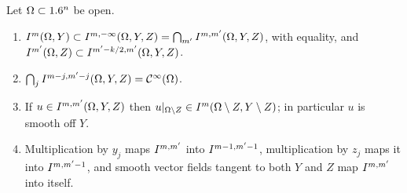\begin{proposition}\label{product:prop:model-properties}
Let $\Omega\subset1.6^n$ be open.
\begin{enumerate}[label=\textup{(\roman*)}]
\item $I^{m}(\Omega,Y)\subset I^{m,-\infty}(\Omega,Y,Z)=\bigcap_{m'}
I^{m,m'}(\Omega,Y,Z)$, with equality, and
$I^{m'}(\Omega,Z)\subset I^{m'-k/2,m'}(\Omega,Y,Z)$.
\item $\bigcap_jI^{m-j,m'-j}(\Omega,Y,Z)=\mathcal{C}^\infty(\Omega)$.
\item If $u\in I^{m,m'}(\Omega,Y,Z)$ then $u|_{\Omega\setminus Z}\in
I^{m}(\Omega\setminus Z,Y\setminus Z)$; in particular $u$ is smooth off $Y$.
\item Multiplication by $y_j$ maps $I^{m,m'}$ into $I^{m-1,m'-1}$, multiplication
by $z_j$ maps it into $I^{m,m'-1}$, and smooth vector fields tangent to both $Y$
and $Z$ map $I^{m,m'}$ into itself.
\end{enumerate}
\end{proposition}

